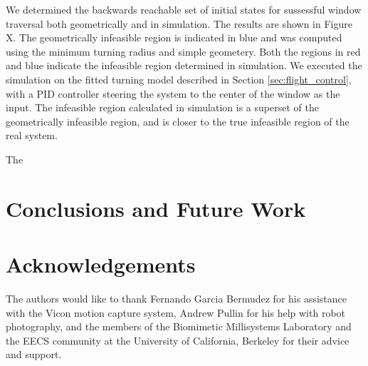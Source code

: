 \documentclass{aamas2013}
\begin{document}
We determined the backwards reachable set of initial states for sussessful window traversal both geometrically and in simulation. The results are shown in Figure X. The geometrically infeasible region is indicated in blue and was computed using the minimum turning radius and simple geometery. Both the regions in red and blue indicate the infeasible region determined in simulation. We executed the simulation on the fitted turning model described in Section \ref{sec:flight_control}, with a PID controller steering the system to the center of the window as the input. The infeasible region calculated in simulation is a superset of the geometrically infeasible region, and is closer to the true infeasible region of the real system.

The

\section{Conclusions and Future Work}

\section{Acknowledgements}
The authors would like to thank Fernando Garcia Bermudez for his assistance with the Vicon motion capture system, Andrew Pullin for his help with robot photography, and the members of the Biomimetic Millisystems Laboratory and the EECS community at the University of California, Berkeley for their advice and support.

\end{document}
